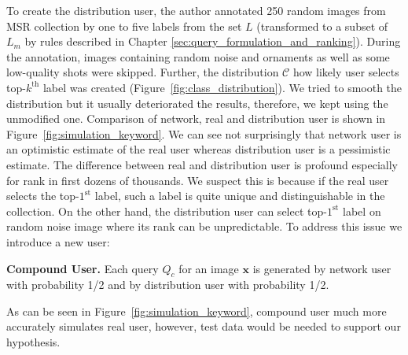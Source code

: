 To create the distribution user, the author annotated 250 random images from MSR collection by one to five labels from the set $L$ (transformed to a subset of $L_m$ by rules described in Chapter \ref{sec:query_formulation_and_ranking}). During the annotation, images containing random noise and ornaments as well as some low-quality shots were skipped. Further, the distribution $\mathcal{C}$ how likely user selects top-$k^{\mathrm{th}}$ label was created (Figure~\ref{fig:class_distribution}). We tried to smooth the distribution but it usually deteriorated the results, therefore, we kept using the unmodified one. Comparison of network, real and distribution user is shown in Figure~\ref{fig:simulation_keyword}. We can see not surprisingly that network user is an optimistic estimate of the real user whereas distribution user is a pessimistic estimate. The difference between real and distribution user is profound especially for rank in first dozens of thousands. We suspect this is because if the real user selects the top-$1^{\mathrm{st}}$ label, such a label is quite unique and distinguishable in the collection. On the other hand, the distribution user can select top-$1^{\mathrm{st}}$ label on random noise image where its rank can be unpredictable. To address this issue we introduce a new user:
\begin{description}[labelwidth=1em, leftmargin=!]
	\item \textbf{Compound User.} Each query $Q_c$ for an image $\bm{x}$ is generated by network user with probability 1/2 and by distribution user with probability 1/2.
\end{description}
As can be seen in Figure~\ref{fig:simulation_keyword}, compound user much more accurately simulates real user, however, test data would be needed to support our hypothesis. 

